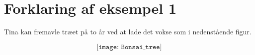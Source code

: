 \section*{Forklaring af eksempel 1}
Tina kan fremavle træet på to år ved at lade det vokse som i nedenstående figur.

\[\texttt{[image: Bonsai\_tree]}\]
